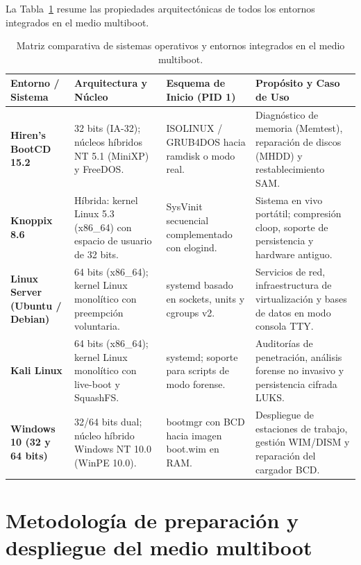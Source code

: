 \documentclass[12pt]{article}
\begin{document}
La Tabla~\ref{tab:comparativaEntornosIntegrados} resume las propiedades arquitectónicas de todos los entornos integrados en el medio multiboot.

\begin{table}[htbp]
\centering
\small
\renewcommand{\arraystretch}{1.15}
\renewcommand{\tabularxcolumn}[1]{m{#1}}
\setlength{\emergencystretch}{1.5em}
\caption{Matriz comparativa de sistemas operativos y entornos integrados en el medio multiboot.}
\label{tab:comparativaEntornosIntegrados}
\begin{tabularx}{\textwidth}{>{\centering\arraybackslash}m{2.5cm} X X X}
\toprule
\textbf{Entorno / Sistema} & \textbf{Arquitectura y Núcleo} & \textbf{Esquema de Inicio (PID 1)} & \textbf{Propósito y Caso de Uso} \\
\midrule
\textbf{Hiren's BootCD 15.2} & 32 bits (IA-32); núcleos híbridos NT 5.1 (MiniXP) y FreeDOS. & ISOLINUX / GRUB4DOS hacia ramdisk o modo real. & Diagnóstico de memoria (Memtest), reparación de discos (MHDD) y restablecimiento SAM. \\
\addlinespace
\textbf{Knoppix 8.6} & Híbrida: kernel Linux 5.3 (x86\_64) con espacio de usuario de 32 bits. & SysVinit secuencial complementado con elogind. & Sistema en vivo portátil; compresión cloop, soporte de persistencia y hardware antiguo. \\
\addlinespace
\textbf{Linux Server (Ubuntu / Debian)} & 64 bits (x86\_64); kernel Linux monolítico con preempción voluntaria. & systemd basado en sockets, units y cgroups v2. & Servicios de red, infraestructura de virtualización y bases de datos en modo consola TTY. \\
\addlinespace
\textbf{Kali Linux} & 64 bits (x86\_64); kernel Linux monolítico con live-boot y SquashFS. & systemd; soporte para scripts de modo forense. & Auditorías de penetración, análisis forense no invasivo y persistencia cifrada LUKS. \\
\addlinespace
\textbf{Windows 10 (32 y 64 bits)} & 32/64 bits dual; núcleo híbrido Windows NT 10.0 (WinPE 10.0). & bootmgr con BCD hacia imagen boot.wim en RAM. & Despliegue de estaciones de trabajo, gestión WIM/DISM y reparación del cargador BCD. \\
\bottomrule
\end{tabularx}
\end{table}

\section{Metodología de preparación y despliegue del medio multiboot}
\label{sec:metodologiaDespliegue}
\end{document}
